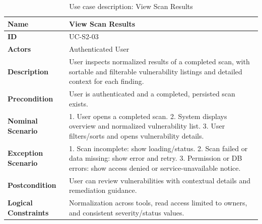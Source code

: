 \begin{table}[H]
    \centering
    \caption{Use case description: View Scan Results}
    \label{tab:view-results-usecase}
    \renewcommand{\arraystretch}{1.4}
    \small
    \begin{tabularx}{\textwidth}{|p{2.5cm}|X|}
        \hline
        \textbf{Name} & View Scan Results \\\hline
        \textbf{ID} & UC-S2-03 \\\hline
        \textbf{Actors} & Authenticated User \\\hline
        \textbf{Description} & User inspects normalized results of a completed scan, with sortable and filterable vulnerability listings and detailed context for each finding. \\\hline
        \textbf{Precondition} & User is authenticated and a completed, persisted scan exists. \\\hline
        \textbf{Nominal Scenario} & 1. User opens a completed scan. 2. System displays overview and normalized vulnerability list. 3. User filters/sorts and opens vulnerability details. \\\hline
        \textbf{Exception Scenario} & 1. Scan incomplete: show loading/status. 2. Scan failed or data missing: show error and retry. 3. Permission or DB errors: show access denied or service-unavailable notice. \\\hline
        \textbf{Postcondition} & User can review vulnerabilities with contextual details and remediation guidance. \\\hline
        \textbf{Logical Constraints} & Normalization across tools, read access limited to owners, and consistent severity/status values. \\\hline
    \end{tabularx}
\end{table}

